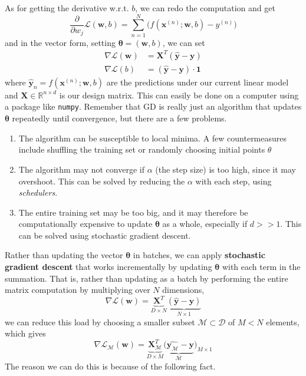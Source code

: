   As for getting the derivative w.r.t. $b$, we can redo the computation and get 
  \begin{equation}
    \frac{\partial}{\partial w_j}\mathcal{L}(\mathbf{w}, b) = \sum_{n=1}^N \big( f (\mathbf{x}^{(n)}; \mathbf{w}, b) - y^{(n)}\big) 
  \end{equation}
  and in the vector form, setting $\boldsymbol{\theta} = (\mathbf{w}, b)$, we can set 
  \begin{align}
    \nabla \mathcal{L} (\mathbf{w}) & = \mathbf{X}^T (\hat{\mathbf{y}} - \mathbf{y}) \\
    \nabla \mathcal{L} (b) & = (\hat{\mathbf{y}} - \mathbf{y}) \cdot \mathbf{1}
  \end{align}
  where $\hat{\mathbf{y}}_n = f(\mathbf{x}^{(n)}; \mathbf{w}, b)$ are the predictions under our current linear model and $\mathbf{X} \in \mathbb{R}^{n \times d}$ is our design matrix. This can easily be done on a computer using a package like \texttt{numpy}. Remember that GD is really just an algorithm that updates $\boldsymbol{\theta}$ repeatedly until convergence, but there are a few problems.
  \begin{enumerate}
    \item The algorithm can be susceptible to local minima. A few countermeasures include shuffling the training set or randomly choosing initial points $\theta$
    \item The algorithm may not converge if $\alpha$ (the step size) is too high, since it may overshoot. This can be solved by reducing the $\alpha$ with each step, using \textit{schedulers}. 
    \item The entire training set may be too big, and it may therefore be computationally expensive to update $\boldsymbol{\theta}$ as a whole, especially if $d >> 1$. This can be solved using stochastic gradient descent.
  \end{enumerate}

  Rather than updating the vector $\boldsymbol{\theta}$ in batches, we can apply \textbf{stochastic gradient descent} that works incrementally by updating $\boldsymbol{\theta}$ with each term in the summation. That is, rather than updating as a batch by performing the entire matrix computation by multiplying over $N$ dimensions,
  \begin{equation}
    \nabla \mathcal{L} (\mathbf{w}) = \underbrace{\mathbf{X}^T}_{D \times N} \underbrace{(\hat{\mathbf{y}} - \mathbf{y})}_{N \times 1}
  \end{equation}
  we can reduce this load by choosing a smaller subset $\mathcal{M} \subset \mathcal{D}$ of $M < N$ elements, which gives 
  \begin{equation}
    \nabla \mathcal{L}_{\mathcal{M}} (\mathbf{w}) = \underbrace{\mathbf{X}_{\mathcal{M}}^T}_{D \times M} \underbrace{(\hat{\mathbf{y}_{\mathcal{M}}} - \mathbf{y}}_{\mathcal{M}})_{M \times 1}
  \end{equation}
  The reason we can do this is because of the following fact.  
  
